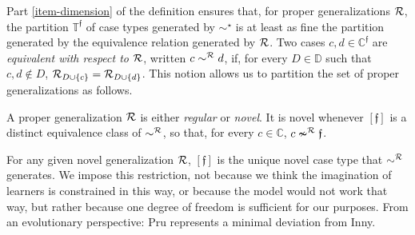 \documentclass[12pt,a4paper,twoside]{article}
\newcommand{\novel}{\mathfrak f}
\newcommand{\Ext}{\operatorname{ext}}
\newcommand{\preceqb}{\mathbin{\preceq}}
\newcommand{\ext}{\mathrel{\mc R}}
\newcommand{\supext}{{\ext}}
\newcommand{\extb}{\mathbin{\mc R}}
\newcommand{\mbbd}{{\mathds D}}
\newcommand{\mbbc}{{\mathds C}}
\newcommand{\mbbcp}{{\mathds C^{\novel}}}
\newcommand{\mbbtp}{{\mathds{T} ^ \novel }}
\begin{document}
Part \ref{item-dimension} of the definition ensures that, for proper {generalization}s
$\ext$, the partition $\mbbtp$ of case types generated by $\sim^{\star}$ is at
least as fine the partition generated by the equivalence relation generated by
$\ext$. Two cases $c,d \in \mbbcp$ are \emph{equivalent with respect to
  $\ext$}, written $c \sim^{\extb} d$, if, for every $D \in \mbbd$ such
that $c,d \notin D$, $\extb _ { D \cup \{c\} } = \extb _ { D \cup\{d\} }$.
This notion allows us to partition the set of proper {generalization}s as follows.


\begin{definition*}\label{def-novel}

  A proper {generalization} $\ext$ is either \emph{regular} or \emph{novel}.  It is
  novel whenever $[\novel]$ is a distinct equivalence class of $\sim^{\supext}$,
  so that, for every $c \in \mbbc$, $c \nsim ^ \supext \novel$.

\end{definition*}



For any given novel {generalization} $\ext$, $[\novel]$ is the unique novel case type
that $\sim^{\extb}$ generates.  We impose this restriction, not because we
think the imagination of learners is constrained in this way, or because the
model would not work that way, but rather because one degree of freedom is
sufficient for our purposes. From an evolutionary perspective: {Pru} represents
a minimal deviation from Inny.

\end{document}

